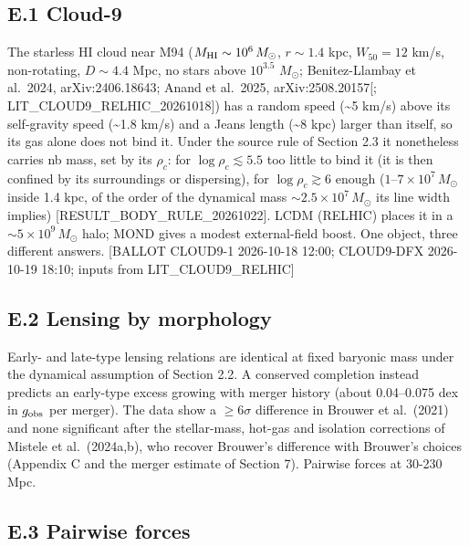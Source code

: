 \documentclass[
  10pt,
]{article}
\begin{document}
\subsection{E.1 Cloud-9}

The starless HI cloud near M94 ($M_{\rm HI}\sim10^6\,M_\odot$, $r\sim1.4$ kpc, $W_{50}=12$ km/s, non-rotating,
$D\sim4.4$ Mpc, no stars above $10^{3.5}$ $M_\odot$;
Benitez-Llambay et al.~2024, arXiv:2406.18643; Anand et al.~2025,
arXiv:2508.20157{[}; LIT\_CLOUD9\_RELHIC\_20261018{]}) has a random
speed (\textasciitilde{}5 km/s) above its self-gravity speed
(\textasciitilde{}1.8 km/s) and a Jeans length (\textasciitilde{}8 kpc)
larger than itself, so its gas alone does not bind it. Under the source rule of
Section 2.3 it nonetheless carries nb mass, set by its $\rho_c$: for
$\log\rho_c\lesssim5.5$ too little to bind it (it is then confined by its
surroundings or dispersing), for $\log\rho_c\gtrsim6$ enough
($1$--$7\times10^7\,M_\odot$ inside 1.4 kpc, of the order of the dynamical mass
$\sim2.5\times10^7\,M_\odot$ its line width implies)
{[}RESULT\_BODY\_RULE\_20261022{]}. LCDM (RELHIC) places it in a
$\sim5\times10^9\,M_\odot$ halo; MOND gives a modest external-field boost.
One object, three different answers. {[}BALLOT CLOUD9-1 2026-10-18
12:00; CLOUD9-DFX 2026-10-19 18:10; inputs from LIT\_CLOUD9\_RELHIC{]}

\subsection{E.2 Lensing by morphology}

Early- and late-type lensing relations are identical at fixed baryonic mass under the dynamical assumption of Section 2.2. A conserved completion instead predicts an early-type excess growing with merger history (about 0.04--0.075 dex in $g_{\rm obs}$ per merger). The data show a $\ge6\sigma$ difference in Brouwer et al.~(2021) and none significant after the stellar-mass, hot-gas and isolation corrections of Mistele et al.~(2024a,b), who recover Brouwer's difference with Brouwer's choices (Appendix C and the merger estimate of Section 7). Pairwise forces at 30-230 Mpc.

\subsection{E.3 Pairwise forces}
\end{document}
